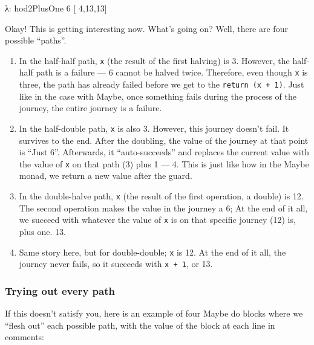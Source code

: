 \documentclass[]{article}
\newenvironment{Shaded}{}{}
\newcommand{\DecValTok}[1]{\textcolor[rgb]{0.25,0.63,0.44}{{#1}}}
\newcommand{\FunctionTok}[1]{\textcolor[rgb]{0.02,0.16,0.49}{{#1}}}
\newcommand{\NormalTok}[1]{{#1}}
\begin{document}
\begin{Shaded}
\begin{Highlighting}[]
\NormalTok{λ}\FunctionTok{:} \NormalTok{hod2PlusOne }\DecValTok{6}
\NormalTok{[   }\DecValTok{4}\NormalTok{,}\DecValTok{13}\NormalTok{,}\DecValTok{13}\NormalTok{]}
\end{Highlighting}
\end{Shaded}

Okay! This is getting interesting now. What's going on? Well, there are
four possible ``paths''.

\begin{enumerate}
\def\labelenumi{\arabic{enumi}.}
\tightlist
\item
  In the half-half path, \texttt{x} (the result of the first halving) is
  3. However, the half-half path is a failure --- 6 cannot be halved
  twice. Therefore, even though \texttt{x} is three, the path has
  already failed before we get to the \texttt{return\ (x\ +\ 1)}. Just
  like in the case with Maybe, once something fails during the process
  of the journey, the entire journey is a failure.
\item
  In the half-double path, \texttt{x} is also 3. However, this journey
  doesn't fail. It survives to the end. After the doubling, the value of
  the journey at that point is ``Just 6''. Afterwards, it
  ``auto-succeeds'' and replaces the current value with the value of
  \texttt{x} on that path (3) plus 1 --- 4. This is just like how in the
  Maybe monad, we return a new value after the guard.
\item
  In the double-halve path, \texttt{x} (the result of the first
  operation, a double) is 12. The second operation makes the value in
  the journey a 6; At the end of it all, we succeed with whatever the
  value of \texttt{x} is on that specific journey (12) is, plus one. 13.
\item
  Same story here, but for double-double; \texttt{x} is 12. At the end
  of it all, the journey never fails, so it succeeds with
  \texttt{x\ +\ 1}, or 13.
\end{enumerate}

\subsubsection{Trying out every path}\label{trying-out-every-path}

If this doesn't satisfy you, here is an example of four Maybe do blocks
where we ``flesh out'' each possible path, with the value of the block
at each line in comments:
\end{document}
